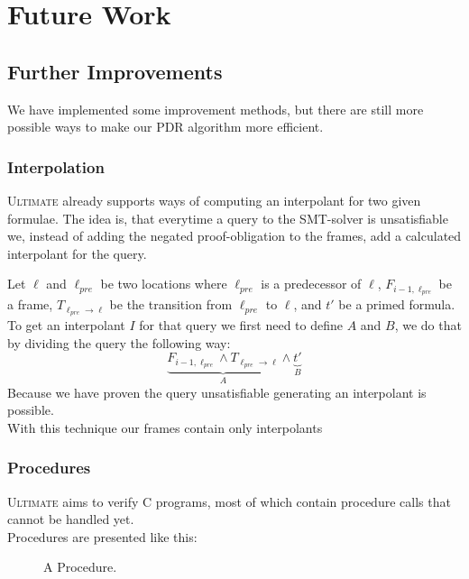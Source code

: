 \documentclass[11pt, a4paper, BCOR=10mm, ngerman]{scrbook}
\begin{document}
\chapter{Future Work}
\section{Further Improvements}
We have implemented some improvement methods, but there are still more possible ways to make our PDR algorithm more efficient.

\subsection{Interpolation}
\textsc{Ultimate} already supports ways of computing an interpolant for two given formulae. The idea is, that everytime a query to the SMT-solver is unsatisfiable we, instead of adding the negated proof-obligation to the frames, add a calculated interpolant for the query. \par
Let $\ell$ and $\ell_{pre}$ be two locations where $\ell_{pre}$ is a predecessor of $\ell$, $F_{i - 1, \ell_{pre}}$ be a frame, $T_{\ell_{pre} \rightarrow \ell}$ be the transition from $\ell_{pre}$ to $\ell$, and $t'$ be a primed formula. \\
To get an interpolant $I$ for that query we first need to define $A$ and $B$, we do that by dividing the query the following way:
\begin{equation*}
\underbrace{F_{i - 1, \ell_{pre}} \land T_{\ell_{pre} \rightarrow \ell}}_{A} \land \underbrace{t'}_B
\end{equation*}
Because we have proven the query unsatisfiable generating an interpolant is possible. \\
With this technique our frames contain only interpolants
\subsection{Procedures}
\textsc{Ultimate} aims to verify C programs, most of which contain procedure calls that cannot be handled yet. \\ Procedures are presented like this: 

\begin{figure}[H]
\centering
{}
  \caption{A Procedure.}
 \end{figure}
 \label{procedure Ex}  
\end{document}
